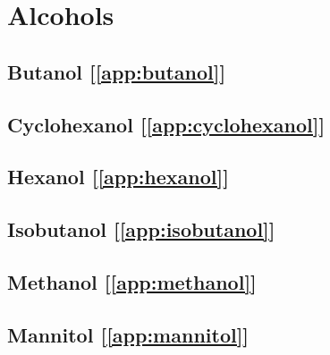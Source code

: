 \chapter{Alcohols}\label{sec:alcohols}
\section{Butanol [\ref{app:butanol}]}\label{sec:butanol}

\section{Cyclohexanol [\ref{app:cyclohexanol}]}\label{sec:cyclohexanol}

\section{Hexanol [\ref{app:hexanol}]}\label{sec:hexanol}

\section{Isobutanol [\ref{app:isobutanol}]}\label{sec:isobutanol}

\section{Methanol [\ref{app:methanol}]}\label{sec:methanol}

\section{Mannitol [\ref{app:mannitol}]}\label{sec:mannitol}
